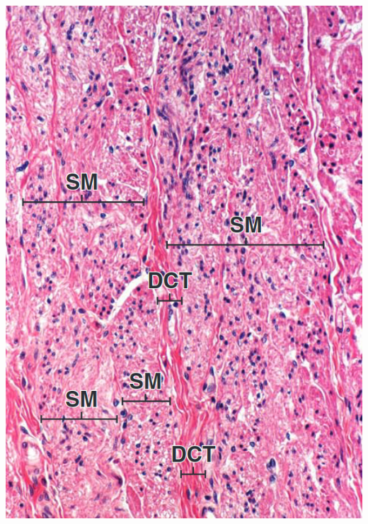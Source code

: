 \begin{itemize}
\begin{center}
    \includegraphics[scale=0.25]{images/week-1-rp13.jpg} 

\end{center}
\end{itemize}
